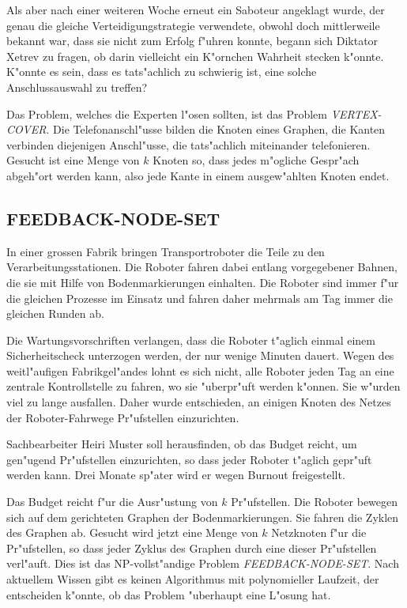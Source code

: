 Als aber nach einer weiteren Woche erneut ein Saboteur angeklagt wurde,
der genau die gleiche Verteidigungstrategie verwendete, obwohl
doch mittlerweile bekannt war, dass sie nicht zum Erfolg f"uhren konnte,
begann sich Diktator Xetrev zu fragen, ob darin vielleicht
ein K"ornchen Wahrheit stecken k"onnte. K"onnte es sein, dass 
es tats"achlich zu schwierig ist, eine solche Anschlussauswahl zu treffen?

\medskip

Das Problem, welches die Experten l"osen sollten, ist das Problem
{\it VERTEX-COVER}. Die Telefonanschl"usse bilden die Knoten eines Graphen,
die Kanten verbinden diejenigen Anschl"usse, die tats"achlich miteinander
telefonieren. Gesucht ist eine Menge von $k$ Knoten so, dass jedes
m"ogliche Gespr"ach abgeh"ort werden kann, also jede Kante in einem
ausgew"ahlten Knoten endet.


\subsection{FEEDBACK-NODE-SET}
In einer grossen Fabrik bringen Transportroboter die Teile zu den
Verarbeitungsstationen.  Die Roboter fahren dabei entlang vorgegebener
Bahnen, die sie mit Hilfe von Bodenmarkierungen einhalten.  Die Roboter
sind immer f"ur die gleichen Prozesse im Einsatz und fahren daher mehrmals
am Tag immer die gleichen Runden ab.

Die Wartungsvorschriften verlangen, dass die Roboter t"aglich einmal einem
Sicherheitscheck unterzogen werden, der nur wenige Minuten dauert. Wegen
des weitl"aufigen Fabrikgel"andes lohnt es sich nicht, alle Roboter jeden
Tag an eine zentrale Kontrollstelle zu fahren, wo sie "uberpr"uft werden
k"onnen. Sie w"urden viel zu lange ausfallen. Daher wurde entschieden, an
einigen Knoten des Netzes der Roboter-Fahrwege Pr"ufstellen einzurichten.

Sachbearbeiter Heiri Muster soll herausfinden, ob das Budget reicht,
um gen"ugend Pr"ufstellen einzurichten, so dass jeder Roboter t"aglich
gepr"uft werden kann.
Drei Monate sp"ater wird er wegen Burnout freigestellt.

\medskip

Das Budget reicht f"ur die Ausr"ustung von $k$ Pr"ufstellen.
Die Roboter bewegen sich auf dem gerichteten Graphen der Bodenmarkierungen.
Sie fahren die Zyklen des Graphen ab. Gesucht wird jetzt eine Menge
von $k$ Netzknoten f"ur die Pr"ufstellen, so dass jeder Zyklus des Graphen
durch eine dieser Pr"ufstellen verl"auft.
Dies ist das NP-vollst"andige Problem {\it FEEDBACK-NODE-SET}.
Nach aktuellem Wissen gibt es keinen Algorithmus mit polynomieller
Laufzeit, der entscheiden k"onnte, ob das Problem "uberhaupt eine
L"osung hat.

